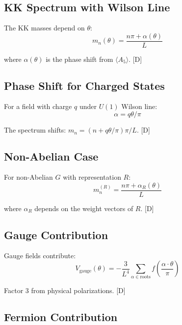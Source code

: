 \documentclass[11pt,a4paper]{article}
\newcommand{\tagD}{\textcolor{blue!70!black}{[D]}}
\begin{document}
\subsection{KK Spectrum with Wilson Line}

The KK masses depend on $\theta$:
\begin{equation}
\label{eq:kk-theta}
m_n(\theta) = \frac{n\pi + \alpha(\theta)}{L}
\end{equation}

where $\alpha(\theta)$ is the phase shift from $\langle A_5 \rangle$. \tagD

\subsection{Phase Shift for Charged States}

For a field with charge $q$ under $U(1)$ Wilson line:
\begin{equation}
\label{eq:phase-shift}
\alpha = q \theta / \pi
\end{equation}

The spectrum shifts: $m_n = (n + q\theta/\pi)\pi/L$. \tagD

\subsection{Non-Abelian Case}

For non-Abelian $G$ with representation $R$:
\begin{equation}
\label{eq:non-abelian-mass}
m_n^{(R)} = \frac{n\pi + \alpha_R(\theta)}{L}
\end{equation}

where $\alpha_R$ depends on the weight vectors of $R$. \tagD

\subsection{Gauge Contribution}

Gauge fields contribute:
\begin{equation}
\label{eq:veff-gauge}
V_{\text{gauge}}(\theta) = -\frac{3}{L^4} \sum_{\alpha \in \text{roots}} f\left(\frac{\alpha \cdot \theta}{\pi}\right)
\end{equation}

Factor 3 from physical polarizations. \tagD

\subsection{Fermion Contribution}
\end{document}
